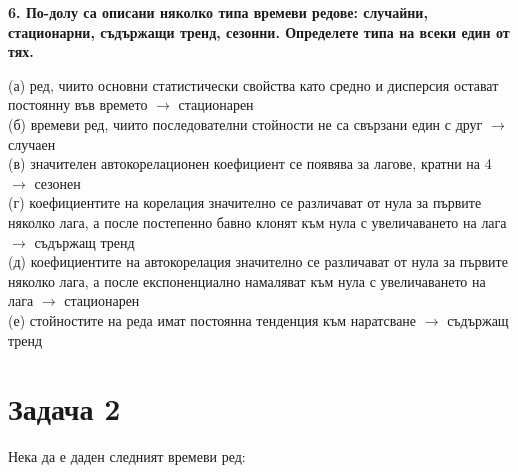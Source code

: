 \documentclass{article}
\begin{document}
\begin{flushleft}
\textbf{6. По-долу са описани няколко типа времеви редове: случайни, стационарни, съдържащи тренд, сезонни. Определете типа на всеки един от тях.}
\begin{flushleft}
(а) ред, чиито основни статистически свойства като средно и дисперсия остават постоянну във времето $\rightarrow$ стационарен \\
(б) времеви ред, чиито последователни стойности не са свързани един с друг $\rightarrow$ случаен \\
(в) значителен автокорелационен коефициент се появява за лагове, кратни на 4 $\rightarrow$ сезонен \\
(г) коефициентите на корелация значително се различават от нула за първите няколко лага, а после постепенно бавно клонят към нула с увеличаването на лага $\rightarrow$ съдържащ тренд \\
(д) коефициентите на автокорелация значително се различават от нула за първите няколко лага, а после експоненциално намаляват към нула с увеличаването на лага $\rightarrow$ стационарен \\
(е) стойностите на реда имат постоянна тенденция към наратсване $\rightarrow$ съдържащ тренд
\end{flushleft}

\end{flushleft}

\section*{Задача 2}
Нека да е даден следният времеви ред:
\end{document}
